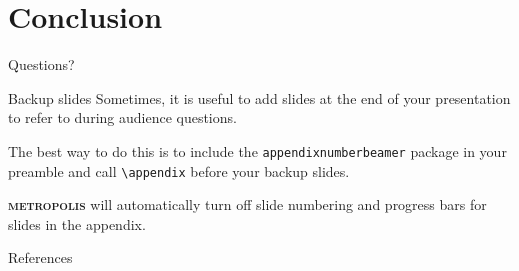 \documentclass[aspectratio=169,10pt]{beamer}
\newcommand{\themename}{\textbf{\textsc{metropolis}}\xspace}
\begin{document}
\section{Conclusion}

\begin{frame}[standout]
  Questions?
\end{frame}

\appendix

\begin{frame}[fragile]{Backup slides}
  Sometimes, it is useful to add slides at the end of your presentation to
  refer to during audience questions.

  The best way to do this is to include the \verb|appendixnumberbeamer|
  package in your preamble and call \verb|\appendix| before your backup slides.

  \themename will automatically turn off slide numbering and progress bars for
  slides in the appendix.
\end{frame}

\begin{frame}[allowframebreaks]{References}

  
  

\end{frame}
\end{document}
